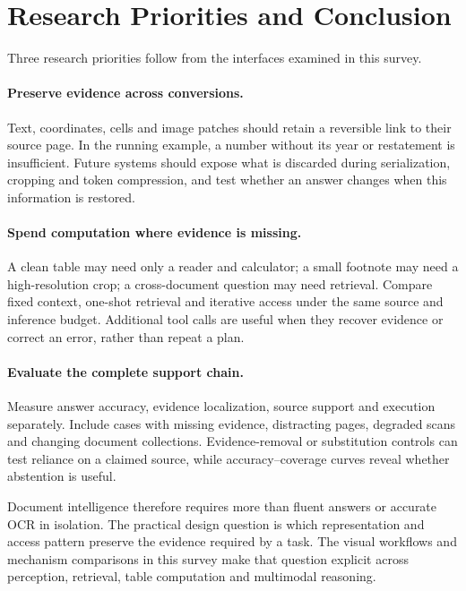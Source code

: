 \section{Research Priorities and Conclusion}
\label{sec:conclusion}

Three research priorities follow from the interfaces examined in this survey.

\paragraph{Preserve evidence across conversions.}
Text, coordinates, cells and image patches should retain a reversible link to their source page. In the running example, a number without its year or restatement is insufficient. Future systems should expose what is discarded during serialization, cropping and token compression, and test whether an answer changes when this information is restored.

\paragraph{Spend computation where evidence is missing.}
A clean table may need only a reader and calculator; a small footnote may need a high-resolution crop; a cross-document question may need retrieval. Compare fixed context, one-shot retrieval and iterative access under the same source and inference budget. Additional tool calls are useful when they recover evidence or correct an error, rather than repeat a plan.

\paragraph{Evaluate the complete support chain.}
Measure answer accuracy, evidence localization, source support and execution separately. Include cases with missing evidence, distracting pages, degraded scans and changing document collections. Evidence-removal or substitution controls can test reliance on a claimed source, while accuracy--coverage curves reveal whether abstention is useful.

Document intelligence therefore requires more than fluent answers or accurate OCR in isolation. The practical design question is which representation and access pattern preserve the evidence required by a task. The visual workflows and mechanism comparisons in this survey make that question explicit across perception, retrieval, table computation and multimodal reasoning.
